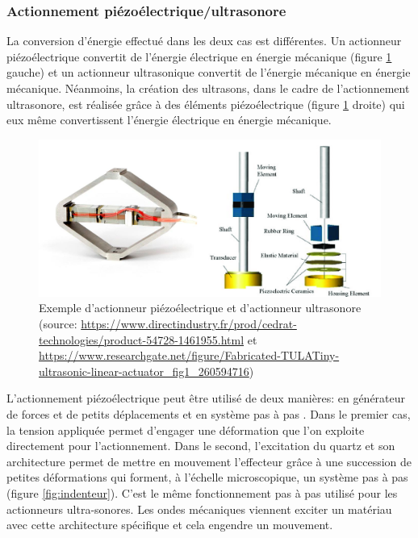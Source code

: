 \documentclass[10pt, a4paper]{article}
\begin{document}
        \subsubsection{Actionnement piézoélectrique/ultrasonore}
        
             \qquad La conversion d'énergie effectué dans les deux cas est différentes. Un actionneur piézoélectrique convertit de l'énergie électrique en énergie mécanique (figure \ref{fig:actPiUl} gauche) et un actionneur ultrasonique convertit de l'énergie mécanique en énergie mécanique. Néanmoins, la création des ultrasons, dans le cadre de l'actionnement ultrasonore, est réalisée grâce à des éléments piézoélectrique \cite{Masamune1995} (figure \ref{fig:actPiUl} droite) qui eux même convertissent l'énergie électrique en énergie mécanique.
            
\begin{figure}[ht!]
\centering
\includegraphics[scale=0.5]{ImageIntro/ActPizeUltr.png}
\caption{ Exemple d'actionneur piézoélectrique et d'actionneur ultrasonore (source: \url{https://www.directindustry.fr/prod/cedrat-technologies/product-54728-1461955.html} et \url{https://www.researchgate.net/figure/Fabricated-TULATiny-ultrasonic-linear-actuator_fig1_260594716}) }
\label{fig:actPiUl}
\end{figure} 
            
            \justify L'actionnement piézoélectrique peut être utilisé de deux manières: en générateur de forces et de petits déplacements \cite{Li2005} et en système pas à pas \cite{Su2012}\cite{Su2015}\cite{Wendt2000}. Dans le premier cas, la tension appliquée permet d'engager une déformation que l'on exploite directement pour l'actionnement. Dans le second, l'excitation du quartz et son architecture permet de mettre en mouvement l'effecteur grâce à une succession de petites déformations qui forment, à l'échelle microscopique, un système pas à pas (figure \ref{fig:indenteur}). C'est le même fonctionnement pas à pas utilisé pour les actionneurs ultra-sonores. Les ondes mécaniques viennent exciter un matériau avec cette architecture spécifique et cela engendre un mouvement.
            
\end{document}
